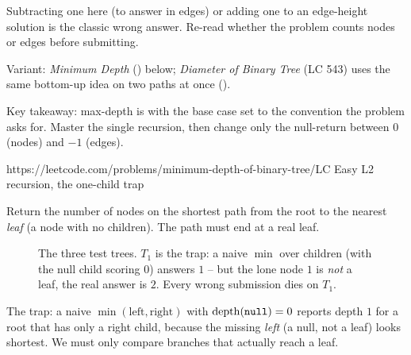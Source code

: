 \begin{warningbox}
Subtracting one here (to answer in edges) or adding one to an edge-height solution is the
classic wrong answer. Re-read whether the problem counts nodes or edges before submitting.
\end{warningbox}
Variant: \emph{Minimum Depth} () below; \emph{Diameter of Binary
Tree} (LC 543) uses the same bottom-up idea on two paths at once ().

\begin{insightbox}
Key takeaway: max-depth is  with the base case set to the
convention the problem asks for. Master the single recursion, then change only the
null-return between $0$ (nodes) and $-1$ (edges).
\end{insightbox}

  {https://leetcode.com/problems/minimum-depth-of-binary-tree/}{LC Easy L2}
  {recursion, the one-child trap}

\begin{problemstatement}
Return the number of nodes on the shortest path from the root to the nearest \emph{leaf}
(a node with no children). The path must end at a real leaf.
\end{problemstatement}

\begin{figure}[H]
\centering
{}
\caption{The three test trees. $T_1$ is the trap: a naive $\min$ over children (with the
null child scoring $0$) answers $1$ -- but the lone node $1$ is \emph{not} a leaf, the
real answer is $2$. Every wrong submission dies on $T_1$.}\label{fig:c01-min-depth-trap}
\end{figure}

The trap: a naive $\min(\text{left},\text{right})$ with $\operatorname{depth}(\texttt{null})=0$ reports depth $1$
for a root that has only a right child, because the missing \emph{left} (a null, not a
leaf) looks shortest. We must only compare branches that actually reach a leaf.

